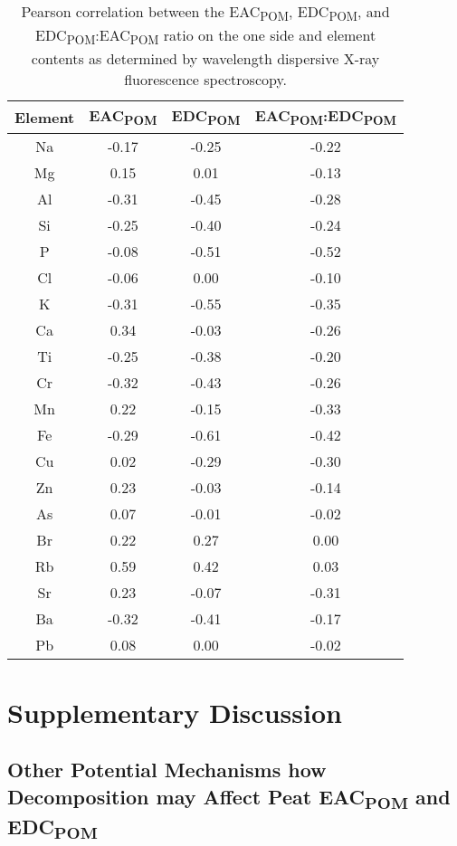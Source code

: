 \documentclass[draft,linenumbers]{agujournal2018}
\begin{document}
\begin{table}

\caption{\label{tab:t-cor-el-xrf}Pearson correlation between the EAC\textsubscript{POM}, EDC\textsubscript{POM}, and EDC\textsubscript{POM}:EAC\textsubscript{POM} ratio on the one side and element contents as determined by wavelength dispersive X-ray fluorescence spectroscopy.}
\centering
\begin{tabular}[t]{cccc}
\toprule
Element & EAC\textsubscript{POM} & EDC\textsubscript{POM} & EAC\textsubscript{POM}:EDC\textsubscript{POM}\\
\midrule
Na & -0.17 & -0.25 & -0.22\\
Mg & 0.15 & 0.01 & -0.13\\
Al & -0.31 & -0.45 & -0.28\\
Si & -0.25 & -0.40 & -0.24\\
P & -0.08 & -0.51 & -0.52\\
\addlinespace
Cl & -0.06 & 0.00 & -0.10\\
K & -0.31 & -0.55 & -0.35\\
Ca & 0.34 & -0.03 & -0.26\\
Ti & -0.25 & -0.38 & -0.20\\
Cr & -0.32 & -0.43 & -0.26\\
\addlinespace
Mn & 0.22 & -0.15 & -0.33\\
Fe & -0.29 & -0.61 & -0.42\\
Cu & 0.02 & -0.29 & -0.30\\
Zn & 0.23 & -0.03 & -0.14\\
As & 0.07 & -0.01 & -0.02\\
\addlinespace
Br & 0.22 & 0.27 & 0.00\\
Rb & 0.59 & 0.42 & 0.03\\
Sr & 0.23 & -0.07 & -0.31\\
Ba & -0.32 & -0.41 & -0.17\\
Pb & 0.08 & 0.00 & -0.02\\
\bottomrule
\end{tabular}
\end{table}

\section{Supplementary Discussion}

\subsection{\texorpdfstring{Other Potential Mechanisms how Decomposition
may Affect Peat EAC\textsubscript{POM} and
EDC\textsubscript{POM}}{Other Potential Mechanisms how Decomposition may Affect Peat EAC and EDC}}
\end{document}
